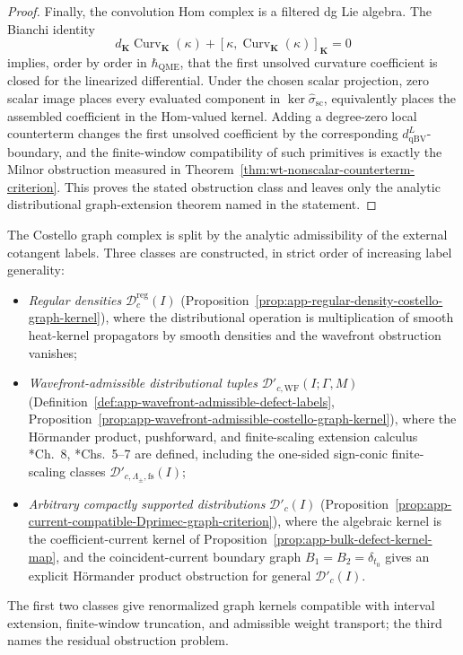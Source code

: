 \begin{proof}
  Finally, the convolution Hom complex is a filtered dg Lie algebra.  The
  Bianchi identity
  \[
    d_{\mathbf K}\operatorname{Curv}_{\mathbf K}(\kappa)
      +[\kappa,\operatorname{Curv}_{\mathbf K}(\kappa)]_{\mathbf K}=0
  \]
  implies, order by order in \(\hbar_{\mathrm{QME}}\), that the first unsolved curvature
  coefficient is closed for the linearized differential.  Under the chosen
  scalar projection, zero scalar image places every evaluated component in
  \(\ker\widehat\sigma_{\mathrm{sc}}\), equivalently places the assembled
  coefficient in the Hom-valued kernel.  Adding a degree-zero local
  counterterm changes the first unsolved coefficient by the corresponding
  \(d_{\mathrm{qBV}}^L\)-boundary, and the finite-window compatibility of
  such primitives is exactly the Milnor obstruction measured in
  Theorem~\ref{thm:wt-nonscalar-counterterm-criterion}.  This proves the
  stated obstruction class and leaves only the analytic distributional
  graph-extension theorem named in the statement.
\end{proof}

\medskip
The Costello graph complex is split by the analytic admissibility of the
external cotangent labels.  Three classes are constructed, in
strict order of increasing label generality:
\begin{itemize}
  \item \emph{Regular densities}
    \(\mathcal D^{\mathrm{reg}}_c(I)\)
    (Proposition~\ref{prop:app-regular-density-costello-graph-kernel}),
	    where the distributional operation is multiplication of
	    smooth heat-kernel propagators by smooth densities and the
	    wavefront obstruction vanishes;
  \item \emph{Wavefront-admissible distributional tuples}
    \(\mathcal D'_{c,\mathrm{WF}}(I;\Gamma,M)\)
    (Definition~\ref{def:app-wavefront-admissible-defect-labels},
    Proposition~\ref{prop:app-wavefront-admissible-costello-graph-kernel}),
    where the H\"ormander product, pushforward, and finite-scaling
    extension calculus
    \cite{hormander-vol1}*{Ch.~8}, \cite{costello-renormalization}*{Chs.~5--7}
    are defined, including the one-sided sign-conic finite-scaling
    classes \(\mathcal D'_{c,\Lambda_\pm,\mathrm{fs}}(I)\);
  \item \emph{Arbitrary compactly supported distributions}
    \(\mathcal D'_c(I)\)
    (Proposition~\ref{prop:app-current-compatible-Dprimec-graph-criterion}),
    where the algebraic kernel is the coefficient-current kernel of
    Proposition~\ref{prop:app-bulk-defect-kernel-map}, and the
	    coincident-current boundary graph
	    \(B_1=B_2=\delta_{t_0}\) gives an explicit H\"ormander product
	    obstruction for general \(\mathcal D'_c(I)\).
\end{itemize}
The first two classes give renormalized graph kernels compatible with
interval extension, finite-window truncation, and admissible weight
transport; the third names the residual obstruction problem.

